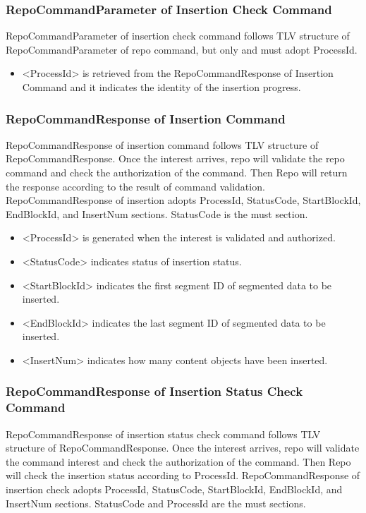 \documentclass{acm_proc_article-sp}
\begin{document}
\subsubsection{RepoCommandParameter of Insertion Check Command}
RepoCommandParameter of insertion check command follows TLV structure of RepoCommandParameter of repo command, but only and must adopt ProcessId.

\begin{itemize}
\item <ProcessId> is retrieved from the RepoCommandResponse of Insertion Command and it indicates the identity of the insertion progress.
\end{itemize}

\subsubsection{RepoCommandResponse of Insertion Command}
RepoCommandResponse of insertion command follows TLV structure of RepoCommandResponse. Once the interest arrives, repo will validate the repo command and check the authorization of the command. Then Repo will return the response according to the result of command validation. RepoCommandResponse of insertion adopts ProcessId, StatusCode, StartBlockId, EndBlockId, and InsertNum sections. StatusCode is the must section.

\begin{itemize}
\item <ProcessId> is generated when the interest is validated and authorized.
\item <StatusCode> indicates status of insertion status.
\item <StartBlockId> indicates the first segment ID of segmented data to be inserted.
\item <EndBlockId> indicates the last segment ID of segmented data to be inserted.
\item <InsertNum> indicates how many content objects have been inserted.
\end{itemize}

\subsubsection{RepoCommandResponse of Insertion Status Check Command}
RepoCommandResponse of insertion status check command follows TLV structure of RepoCommandResponse. Once the interest arrives, repo will validate the command interest and check the authorization of the command. Then Repo will check the insertion status according to ProcessId. RepoCommandResponse of insertion check adopts ProcessId, StatusCode, StartBlockId, EndBlockId, and InsertNum sections. StatusCode and ProcessId are the must sections.
\end{document}

